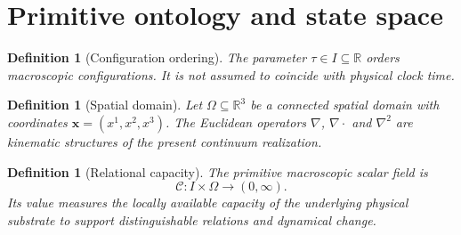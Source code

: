 \documentclass[11pt,a4paper]{article}
\newtheorem{definition}[axiom]{Definition}
\newcommand{\C}{\mathcal{C}}
\begin{document}
\begin{table}[H]
\centering
\caption{Closure ledger used throughout the manuscript (continued).}
\label{tab:closure-ledger-continued}
\end{table}

\section{Primitive ontology and state space}

\begin{definition}[Configuration ordering]
The parameter \(\tau\in I\subseteq\mathbb{R}\) orders macroscopic configurations. It is not assumed to coincide with physical clock time.
\end{definition}

\begin{definition}[Spatial domain]
Let \(\Omega\subseteq\mathbb{R}^3\) be a connected spatial domain with coordinates \(\mathbf{x}=(x^1,x^2,x^3)\). The Euclidean operators \(\nabla\), \(\nabla\cdot\) and \(\nabla^2\) are kinematic structures of the present continuum realization.
\end{definition}

\begin{definition}[Relational capacity]
The primitive macroscopic scalar field is
\[
\C:I\times\Omega\to(0,\infty).
\]
Its value measures the locally available capacity of the underlying physical substrate to support distinguishable relations and dynamical change.
\end{definition}
\end{document}
